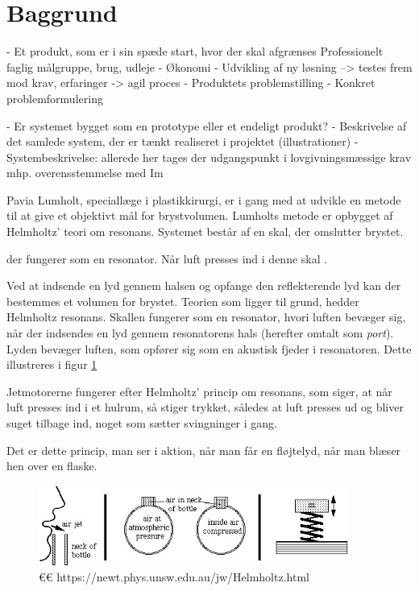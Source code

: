 \section{Baggrund}
- Et produkt, som er i sin spæde start, hvor der skal afgrænses
 Professionelt faglig målgruppe,  brug, udleje 
- Økonomi 
- Udvikling af ny løsning --> testes frem mod krav, erfaringer -> agil proces
- Produktets problemstilling
- Konkret problemformulering

- Er systemet bygget som en prototype eller et endeligt produkt? 
- Beskrivelse af det samlede system, der er tænkt realiseret i projektet (illustrationer)
- Systembeskrivelse: allerede her tages der udgangspunkt i lovgivningsmæssige krav mhp. overensstemmelse med Im 


Pavia Lumholt, speciallæge i plastikkirurgi, er i gang med at udvikle en metode til at give et objektivt mål for brystvolumen. Lumholts metode er opbygget af Helmholtz' teori om resonans. Systemet består af en skal, der omslutter brystet.  


der fungerer som en resonator. Når luft presses ind i denne skal . 

 Ved at indsende en lyd gennem halsen og opfange den reflekterende lyd kan der bestemmes et volumen for brystet. Teorien som ligger til grund, hedder Helmholtz resonans. Skallen fungerer som en resonator, hvori luften bevæger sig, når der indsendes en lyd gennem resonatorens hals (herefter omtalt som \textit{port}). Lyden bevæger luften, som opfører sig som en akustisk fjeder i resonatoren. Dette illustreres i  figur \ref{fig:Helmholtzteori}

Jetmotorerne fungerer efter Helmholtz' princip om resonans, som siger, at når luft presses ind i et hulrum, så stiger trykket, således at luft presses ud og bliver suget tilbage ind, noget som sætter svingninger i gang.

Det er dette princip, man ser i aktion, når man får en fløjtelyd, når man blæser hen over en flaske.

\begin{figure}[htb]
\centering
\includegraphics[width=4in]{Helmholtzresonans}
\caption{€€ https://newt.phys.unsw.edu.au/jw/Helmholtz.html}
\label{fig:Helmholtzteori}
\end{figure}


